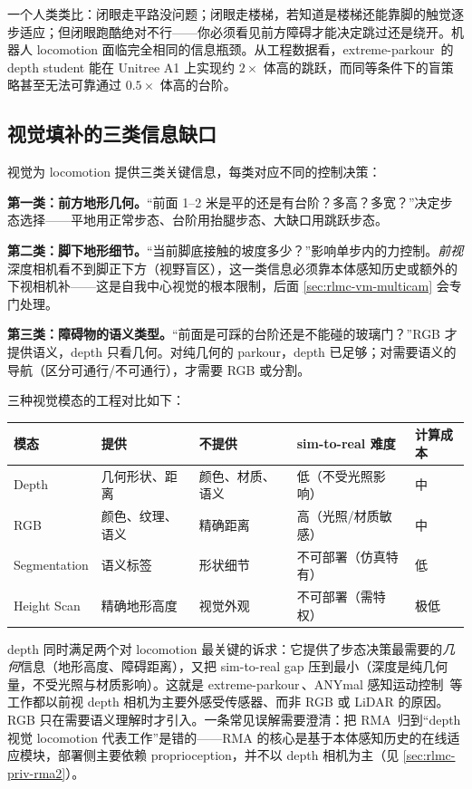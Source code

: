 一个人类类比：闭眼走平路没问题；闭眼走楼梯，若知道是楼梯还能靠脚的触觉逐步适应；但闭眼跑酷绝对不行——你必须看见前方障碍才能决定跳过还是绕开。机器人 locomotion 面临完全相同的信息瓶颈。从工程数据看，extreme-parkour\,\cite{cheng2024parkour} 的 depth student 能在 Unitree A1 上实现约 $2\times$ 体高的跳跃，而同等条件下的盲策略甚至无法可靠通过 $0.5\times$ 体高的台阶。

\subsection{视觉填补的三类信息缺口}
\label{sec:rlmc-vm-gap}

视觉为 locomotion 提供三类关键信息，每类对应不同的控制决策：

\textbf{第一类：前方地形几何。}“前面 1--2 米是平的还是有台阶？多高？多宽？”决定步态选择——平地用正常步态、台阶用抬腿步态、大缺口用跳跃步态。

\textbf{第二类：脚下地形细节。}“当前脚底接触的坡度多少？”影响单步内的力控制。\emph{前视}深度相机看不到脚正下方（视野盲区），这一类信息必须靠本体感知历史或额外的下视相机补——这是自我中心视觉的根本限制，后面 \cref{sec:rlmc-vm-multicam} 会专门处理。

\textbf{第三类：障碍物的语义类型。}“前面是可踩的台阶还是不能碰的玻璃门？”RGB 才提供语义，depth 只看几何。对纯几何的 parkour，depth 已足够；对需要语义的导航（区分可通行/不可通行），才需要 RGB 或分割。

三种视觉模态的工程对比如下：

\begin{center}
\small
\begin{tabular}{@{}lllll@{}}
\toprule
模态 & 提供 & 不提供 & sim-to-real 难度 & 计算成本 \\
\midrule
Depth & 几何形状、距离 & 颜色、材质、语义 & 低（不受光照影响） & 中 \\
RGB & 颜色、纹理、语义 & 精确距离 & 高（光照/材质敏感） & 中 \\
Segmentation & 语义标签 & 形状细节 & 不可部署（仿真特有） & 低 \\
Height Scan & 精确地形高度 & 视觉外观 & 不可部署（需特权） & 极低 \\
\bottomrule
\end{tabular}
\end{center}

\begin{insight}\label{ins:rlmc-vm-depthking}
depth 同时满足两个对 locomotion 最关键的诉求：它提供了步态决策最需要的\emph{几何}信息（地形高度、障碍距离），又把 sim-to-real gap 压到最小（深度是纯几何量，不受光照与材质影响）。这就是 extreme-parkour\,\cite{cheng2024parkour}、ANYmal 感知运动控制\,\cite{miki2022perceptive} 等工作都以前视 depth 相机为主要外感受传感器、而非 RGB 或 LiDAR 的原因。RGB 只在需要语义理解时才引入。一条常见误解需要澄清：把 RMA\,\cite{kumar2021rma} 归到“depth 视觉 locomotion 代表工作”是错的——RMA 的核心是基于本体感知历史的在线适应模块，部署侧主要依赖 proprioception，并不以 depth 相机为主（见 \cref{sec:rlmc-priv-rma2}）。
\end{insight}

